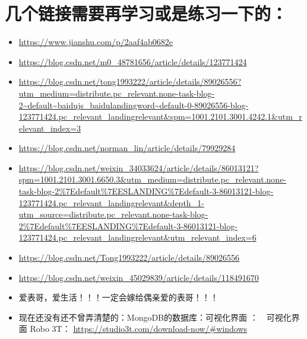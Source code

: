 \documentclass[9pt, b5paper]{article}
\begin{document}
\section{几个链接需要再学习或是练习一下的：}
\label{sec-23}
\begin{itemize}
\item \url{https://www.jianshu.com/p/2aaf4ab0682e}
\item \url{https://blog.csdn.net/m0_48781656/article/details/123771424}
\item \url{https://blog.csdn.net/tong1993222/article/details/89026556?utm_medium=distribute.pc_relevant.none-task-blog-2~default~baidujs_baidulandingword~default-0-89026556-blog-123771424.pc_relevant_landingrelevant&spm=1001.2101.3001.4242.1&utm_relevant_index=3}
\item \url{https://blog.csdn.net/norman_lin/article/details/79929284}
\item \url{https://blog.csdn.net/weixin_34033624/article/details/86013121?spm=1001.2101.3001.6650.3&utm_medium=distribute.pc_relevant.none-task-blog-2\%7Edefault\%7EESLANDING\%7Edefault-3-86013121-blog-123771424.pc_relevant_landingrelevant&depth_1-utm_source=distribute.pc_relevant.none-task-blog-2\%7Edefault\%7EESLANDING\%7Edefault-3-86013121-blog-123771424.pc_relevant_landingrelevant&utm_relevant_index=6}
\item \url{https://blog.csdn.net/Tong1993222/article/details/89026556}
\item \url{https://blog.csdn.net/weixin_45029839/article/details/118491670}
\item 爱表哥，爱生活！！！一定会嫁给偶亲爱的表哥！！！
\item 现在还没有还不曾弄清楚的：MongoDB的数据库：可视化界面 ：　可视化界面 Robo 3T： \url{https://studio3t.com/download-now/#windows}
\end{itemize}
\end{document}
